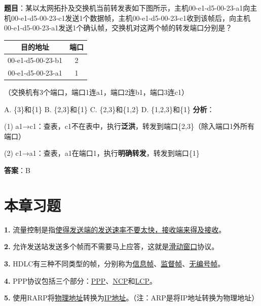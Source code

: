 \begin{examplebox}[例题3.8 2014年真题]
\textbf{题目}：某以太网拓扑及交换机当前转发表如下图所示，主机00-e1-d5-00-23-a1向主机00-e1-d5-00-23-c1发送1个数据帧，主机00-e1-d5-00-23-c1收到该帧后，向主机00-e1-d5-00-23-a1发送1个确认帧，交换机对这两个帧的转发端口分别是？

\begin{center}\small
\begin{tabular}{|c|c|}
\hline
目的地址 & 端口 \\
\hline
00-e1-d5-00-23-b1 & 2 \\
00-e1-d5-00-23-a1 & 1 \\
\hline
\end{tabular}
\end{center}
（交换机有3个端口，端口1连a1，端口2连b1，端口3连c1）

A. \{3\}和\{1\} \quad B. \{2,3\}和\{1\} \quad C. \{2,3\}和\{1,2\} \quad D. \{1,2,3\}和\{1\}
\tcblower
\textbf{分析}：

(1) a1→c1：查表，c1不在表中，执行\textbf{泛洪}，转发到端口\{2,3\}（除入端口1外所有端口）

(2) c1→a1：查表，a1在端口1，执行\textbf{明确转发}，转发到端口\{1\}

\textbf{答案}：B
\end{examplebox}

\section{本章习题}

\begin{examplebox}[填空题]
\textbf{1.} 流量控制是指\underline{使得发送端的发送速率不要太快，接收端来得及接收}。

\textbf{2.} 允许发送站发送多个帧而不需要马上应答，这就是\underline{滑动窗口}协议。

\textbf{3.} HDLC有三种不同类型的帧，分别称为\underline{信息帧}、\underline{监督帧}、\underline{无编号帧}。

\textbf{4.} PPP协议包括三个部分：\underline{PPP}、\underline{NCP}和\underline{LCP}。

\textbf{5.} 使用RARP将\underline{物理地址}转换为\underline{IP地址}。（注：ARP是将IP地址转换为物理地址）
\end{examplebox}

